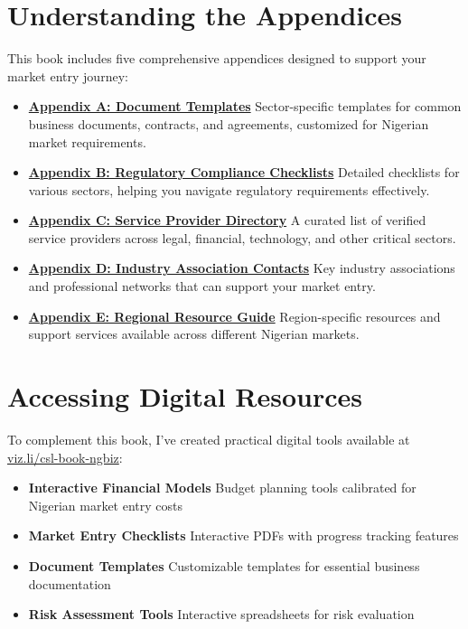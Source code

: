 \section{Understanding the Appendices}\label{sec:understanding-appendices}

This book includes five comprehensive appendices designed to support your market entry journey:

\begin{itemize}
    \item \textbf{\hyperref[ch:document-templates]{Appendix A: Document Templates}}
    Sector-specific templates for common business documents, contracts, and agreements, customized for Nigerian market requirements.

    \item \textbf{\hyperref[ch:regulatory-compliance]{Appendix B: Regulatory Compliance Checklists}}
    Detailed checklists for various sectors, helping you navigate regulatory requirements effectively.

    \item \textbf{\hyperref[ch:service-provider-directory]{Appendix C: Service Provider Directory}}
    A curated list of verified service providers across legal, financial, technology, and other critical sectors.

    \item \textbf{\hyperref[ch:industry-associations]{Appendix D: Industry Association Contacts}}
    Key industry associations and professional networks that can support your market entry.

    \item \textbf{\hyperref[ch:regional-resources]{Appendix E: Regional Resource Guide}}
    Region-specific resources and support services available across different Nigerian markets.
\end{itemize}

\section{Accessing Digital Resources}\label{sec:digital-resources}

To complement this book, I've created practical digital tools available at \href{https://viz.li/csl-book-ngbiz}{viz.li/csl-book-ngbiz}:

\begin{itemize}
    \item \textbf{Interactive Financial Models}
    Budget planning tools calibrated for Nigerian market entry costs

    \item \textbf{Market Entry Checklists}
    Interactive PDFs with progress tracking features

    \item \textbf{Document Templates}
    Customizable templates for essential business documentation

    \item \textbf{Risk Assessment Tools}
    Interactive spreadsheets for risk evaluation
\end{itemize}

